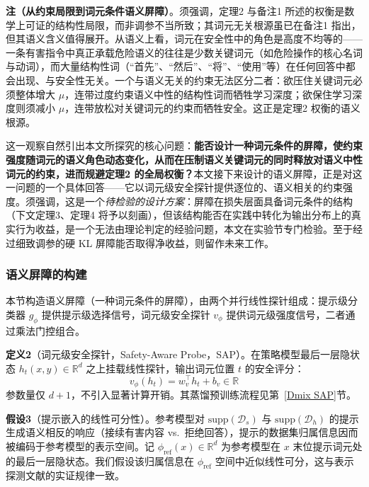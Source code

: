 \documentclass[lettersize,journal]{IEEEtran}
\begin{document}
\textbf{注（从约束局限到词元条件语义屏障）}。须强调，定理2 与备注1 所述的权衡是数学上可证的结构性局限，而非调参不当所致；其词元无关根源虽已在备注1 指出，但其语义含义值得展开。从语义上看，词元在安全性中的角色是高度不均等的——一条有害指令中真正承载危险语义的往往是少数关键词元（如危险操作的核心名词与动词），而大量结构性词（“首先”、“然后”、“将”、“使用”等）在任何回答中都会出现、与安全性无关。一个与语义无关的约束无法区分二者：欲压住关键词元必须整体增大 $\mu$，连带过度约束语义中性的结构性词而牺牲学习深度；欲保住学习深度则须减小 $\mu$，连带放松对关键词元的约束而牺牲安全。这正是定理2 权衡的语义根源。

这一观察自然引出本文所探究的核心问题：\textbf{能否设计一种词元条件的屏障，使约束强度随词元的语义角色动态变化，从而在压制语义关键词元的同时释放对语义中性词元的约束，进而规避定理2 的全局权衡？}本文接下来设计的语义屏障，正是对这一问题的一个具体回答——它以词元级安全探针提供逐位的、语义相关的约束强度。须强调，这是一个\textit{待检验的设计方案}：屏障在损失层面具备词元条件的结构（下文定理3、定理4 将予以刻画），但该结构能否在实践中转化为输出分布上的真实行为收益，是一个无法由理论判定的经验问题，本文在实验节专门检验。至于经过细致调参的硬 KL 屏障能否取得净收益，则留作未来工作。

\subsubsection{语义屏障的构建}\label{sec:semantic-barrier}
本节构造语义屏障（一种词元条件的屏障），由两个并行线性探针组成：提示级分类器 $g_\phi$ 提供提示级选择信号，词元级安全探针 $v_\phi$ 提供词元级强度信号，二者通过乘法门控组合。

\textbf{定义2}（词元级安全探针，Safety-Aware Probe，SAP）。在策略模型最后一层隐状态 $h_t(x,y) \in \mathbb{R}^d$ 之上挂载线性探针，输出词元位置 $t$ 的安全评分：
\begin{equation}\label{eq:sap-form}
    v_\phi(h_t) = w_v^\top h_t + b_v \in \mathbb{R}
\end{equation}
参数量仅 $d+1$，不引入显著计算开销。其蒸馏预训练流程见第~\ref{Dmix SAP}节。

\textbf{假设3}（提示嵌入的线性可分性）。参考模型对 $\mathrm{supp}(\mathcal{D}_s)$ 与 $\mathrm{supp}(\mathcal{D}_h)$ 的提示生成语义相反的响应（接续有害内容 vs.\ 拒绝回答），提示的数据集归属信息因而被编码于参考模型的表示空间。记 $\phi_{\text{ref}}(x) \in \mathbb{R}^d$ 为参考模型在 $x$ 末位提示词元处的最后一层隐状态。我们假设该归属信息在 $\phi_{\text{ref}}$ 空间中近似线性可分，这与表示探测文献的实证规律一致\cite{alain2017understanding}。
\end{document}
